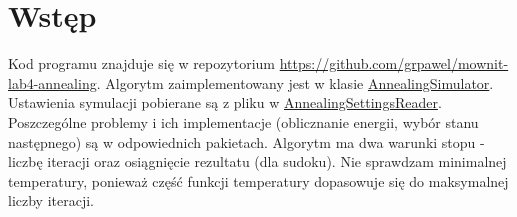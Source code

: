 \section{Wstęp}
Kod programu znajduje się w repozytorium \url{https://github.com/grpawel/mownit-lab4-annealing}.
Algorytm zaimplementowany jest w klasie \href{https://github.com/grpawel/mownit-lab4-annealing/blob/master/src/pl/edu/agh/mownit/lab4/annealing/AnnealingSimulator.java}{AnnealingSimulator}. Ustawienia symulacji pobierane są z pliku w \href{https://github.com/grpawel/mownit-lab4-annealing/blob/master/src/pl/edu/agh/mownit/lab4/annealing/AnnealingSettingsReader.java}{AnnealingSettingsReader}. Poszczególne problemy i ich implementacje (oblicznanie energii, wybór stanu następnego) są w odpowiednich pakietach.
Algorytm ma dwa warunki stopu - liczbę iteracji oraz osiągnięcie rezultatu (dla sudoku). Nie sprawdzam minimalnej temperatury, ponieważ część funkcji temperatury dopasowuje się do maksymalnej liczby iteracji.
